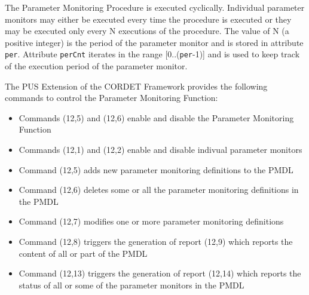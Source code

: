 \documentclass{pnp_article}
\begin{document}
The Parameter Monitoring Procedure is executed cyclically. Individual parameter monitors may either be executed every time the procedure is executed or they may be executed only every N executions of the procedure. The value of N (a positive integer) is the period of the parameter monitor and is stored in attribute \texttt{per}. Attribute \texttt{perCnt} iterates in the range [0..(\texttt{per}-1)] and is used to keep track of the execution period of the parameter monitor.

The PUS Extension of the CORDET Framework provides the following commands to control the Parameter Monitoring Function:

\begin{itemize}
\item Commands (12,5) and (12,6) enable and disable the Parameter Monitoring Function
\item Commands (12,1) and (12,2) enable and disable indivual parameter monitors
\item Command (12,5) adds new parameter monitoring definitions to the PMDL
\item Command (12,6) deletes some or all the parameter monitoring definitions in the PMDL
\item Command (12,7) modifies one or more parameter monitoring definitions
\item Command (12,8) triggers the generation of report (12,9) which reports the content of all or part of the PMDL
\item Command (12,13) triggers the generation of report (12,14) which reports the status of all or some of the parameter monitors in the PMDL
\end{itemize}
\end{document}
